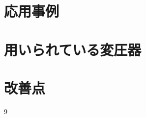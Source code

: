 \documentclass[dvipdfmx, a4paper]{jsarticle}
\begin{document}
  \section{応用事例}
  \section{用いられている変圧器}
  \section{改善点}
  \begin{thebibliography}{9}
  \end{thebibliography}
\end{document}
